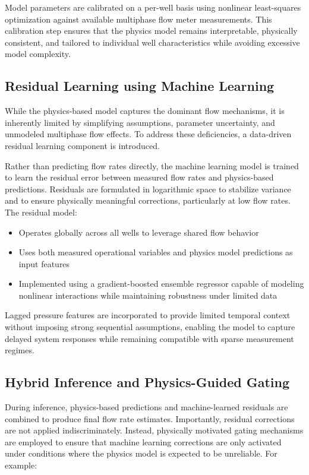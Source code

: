 \documentclass[12pt,APA]{uomthesis}
\begin{document}
Model parameters are calibrated on a per-well basis using nonlinear least-squares optimization against available multiphase flow meter measurements. This calibration step ensures that the physics model remains interpretable, physically consistent, and tailored to individual well characteristics while avoiding excessive model complexity.

\subsection{Residual Learning using Machine Learning}
While the physics-based model captures the dominant flow mechanisms, it is inherently limited by simplifying assumptions, parameter uncertainty, and unmodeled multiphase flow effects. To address these deficiencies, a data-driven residual learning component is introduced.

Rather than predicting flow rates directly, the machine learning model is trained to learn the residual error between measured flow rates and physics-based predictions. Residuals are formulated in logarithmic space to stabilize variance and to ensure physically meaningful corrections, particularly at low flow rates.
The residual model:

\begin{itemize}
    \item Operates globally across all wells to leverage shared flow behavior
    \item Uses both measured operational variables and physics model predictions as input features
    \item Implemented using a gradient-boosted ensemble regressor capable of modeling nonlinear interactions while maintaining robustness under limited data
\end{itemize}

Lagged pressure features are incorporated to provide limited temporal context without imposing strong sequential assumptions, enabling the model to capture delayed system responses while remaining compatible with sparse measurement regimes.

\subsection{Hybrid Inference and Physics-Guided Gating}
During inference, physics-based predictions and machine-learned residuals are combined to produce final flow rate estimates. Importantly, residual corrections are not applied indiscriminately. Instead, physically motivated gating mechanisms are employed to ensure that machine learning corrections are only activated under conditions where the physics model is expected to be unreliable.
For example:
\end{document}
